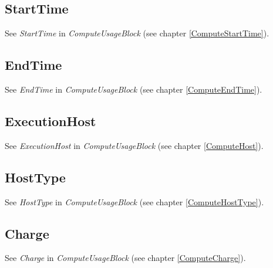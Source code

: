 \subsection{StartTime}

See \emph{StartTime} in \emph{ComputeUsageBlock} (see chapter \ref{ComputeStartTime}).






\subsection{EndTime}

See \emph{EndTime} in \emph{ComputeUsageBlock} (see chapter \ref{ComputeEndTime}).






\subsection{ExecutionHost} \label{MemoryHost}

See \emph{ExecutionHost} in \emph{ComputeUsageBlock} (see chapter \ref{ComputeHost}).









\subsection{HostType}

See \emph{HostType} in \emph{ComputeUsageBlock} (see chapter \ref{ComputeHostType}).






\subsection{Charge}

See \emph{Charge} in \emph{ComputeUsageBlock} (see chapter \ref{ComputeCharge}).
